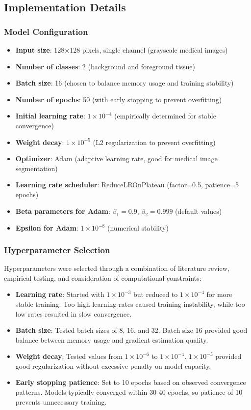 \documentclass[12pt,a4paper]{article}
\begin{document}
\subsection{Implementation Details}

\subsubsection{Model Configuration}
\begin{itemize}
    \item \textbf{Input size}: 128×128 pixels, single channel (grayscale medical images)
    \item \textbf{Number of classes}: 2 (background and foreground tissue)
    \item \textbf{Batch size}: 16 (chosen to balance memory usage and training stability)
    \item \textbf{Number of epochs}: 50 (with early stopping to prevent overfitting)
    \item \textbf{Initial learning rate}: $1 \times 10^{-4}$ (empirically determined for stable convergence)
    \item \textbf{Weight decay}: $1 \times 10^{-5}$ (L2 regularization to prevent overfitting)
    \item \textbf{Optimizer}: Adam (adaptive learning rate, good for medical image segmentation)
    \item \textbf{Learning rate scheduler}: ReduceLROnPlateau (factor=0.5, patience=5 epochs)
    \item \textbf{Beta parameters for Adam}: $\beta_1 = 0.9$, $\beta_2 = 0.999$ (default values)
    \item \textbf{Epsilon for Adam}: $1 \times 10^{-8}$ (numerical stability)
\end{itemize}

\subsubsection{Hyperparameter Selection}

Hyperparameters were selected through a combination of literature review, empirical testing, and consideration of computational constraints:

\begin{itemize}
    \item \textbf{Learning rate}: Started with $1 \times 10^{-3}$ but reduced to $1 \times 10^{-4}$ for more stable training. Too high learning rates caused training instability, while too low rates resulted in slow convergence.
    \item \textbf{Batch size}: Tested batch sizes of 8, 16, and 32. Batch size 16 provided good balance between memory usage and gradient estimation quality.
    \item \textbf{Weight decay}: Tested values from $1 \times 10^{-6}$ to $1 \times 10^{-4}$. $1 \times 10^{-5}$ provided good regularization without excessive penalty on model capacity.
    \item \textbf{Early stopping patience}: Set to 10 epochs based on observed convergence patterns. Models typically converged within 30-40 epochs, so patience of 10 prevents unnecessary training.
\end{itemize}
\end{document}
